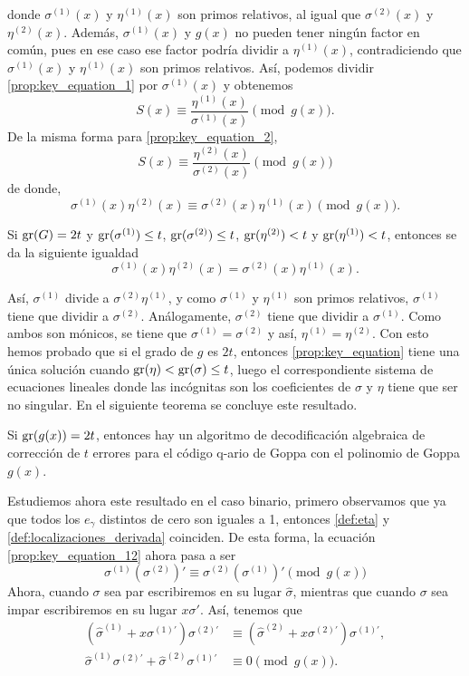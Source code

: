 donde $\sigma^{(1)}(x)$ y $\eta^{(1)}(x)$ son primos relativos, al igual que $\sigma^{(2)}(x)$ y $\eta^{(2)}(x)$. Además, $\sigma^{(1)}(x)$ y $g(x)$ no pueden tener ningún factor en común, pues en ese caso ese factor podría dividir a $\eta^{(1)}(x)$, contradiciendo que $\sigma^{(1)}(x)$ y $\eta^{(1)}(x)$ son primos relativos. Así, podemos dividir \eqref{prop:key_equation_1} por $\sigma^{(1)}(x)$ y obtenemos
\[
    S(x) \equiv \frac{\eta^{(1)}(x)}{\sigma^{(1)}(x)} \pmod{g(x)}.
\]
De la misma forma para \eqref{prop:key_equation_2},
\[
    S(x) \equiv \frac{\eta^{(2)}(x)}{\sigma^{(2)}(x)} \pmod{g(x)}
\]
de donde,
\begin{equation}
    \label{prop:key_equation_12}
    \sigma^{(1)}(x) \eta^{(2)}(x) \equiv \sigma^{(2)}(x) \eta^{(1)}(x) \pmod{g(x)}.
\end{equation}

Si $\operatorname{gr}(G) = 2t$ y $\operatorname{gr}(\sigma^{(1)}) \leq t$, $\operatorname{gr}(\sigma^{(2)}) \leq t$, $\operatorname{gr}(\eta^{(2)}) < t$ y $\operatorname{gr}(\eta^{(1)}) < t$, entonces se da la siguiente igualdad
\begin{equation}
    \label{prop:key_equation_caso1}
    \sigma^{(1)}(x) \eta^{(2)}(x) = \sigma^{(2)}(x) \eta^{(1)}(x).
\end{equation}

Así, $\sigma^{(1)}$ divide a $\sigma^{(2)} \eta^{(1)}$, y como $\sigma^{(1)}$ y $\eta^{(1)}$ son primos relativos, $\sigma^{(1)}$ tiene que dividir a $\sigma^{(2)}$. Análogamente, $\sigma^{(2)}$ tiene que dividir a $\sigma^{(1)}$. Como ambos son mónicos, se tiene que $\sigma^{(1)} = \sigma^{(2)}$ y así, $\eta^{(1)} = \eta^{(2)}$. Con esto hemos probado que si el grado de $g$ es $2t$, entonces \eqref{prop:key_equation} tiene una única solución cuando $\operatorname{gr}(\eta) < \operatorname{gr}(\sigma) \leq t$, luego el correspondiente sistema de ecuaciones lineales donde las incógnitas son los coeficientes de $\sigma$ y $\eta$ tiene que ser no singular. En el siguiente teorema se concluye este resultado.

\begin{theorem}
    Si $\operatorname{gr}(g(x)) = 2t$, entonces hay un algoritmo de decodificación algebraica de corrección de $t$ errores para el código q-ario de Goppa con el polinomio de Goppa $g(x)$.
\end{theorem}

Estudiemos ahora este resultado en el caso binario, primero observamos que ya que todos los $e_\gamma$ distintos de cero son iguales a 1, entonces \eqref{def:eta} y \eqref{def:localizaciones_derivada} coinciden. De esta forma, la ecuación \eqref{prop:key_equation_12} ahora pasa a ser
\[
    \sigma^{(1)} \left( \sigma^{(2)} \right) ' \equiv \sigma^{(2)} \left( \sigma^{(1)} \right) ' \pmod{g(x)}
\]
Ahora, cuando $\sigma$ sea par escribiremos en su lugar $\hat{\sigma}$, mientras que cuando $\sigma$ sea impar escribiremos en su lugar $x \sigma '$. Así, tenemos que
\begin{align*} 
    \left( \hat{\sigma}^{(1)} + x \sigma^{(1)'} \right) \sigma^{(2)'} &\equiv \left( \hat{\sigma}^{(2)} + x \sigma^{(2)'} \right) \sigma^{(1)'},\\ 
    \hat{\sigma}^{(1)} \sigma^{(2)'} + \hat{\sigma}^{(2)} \sigma^{(1)'} &\equiv 0 \pmod{g(x)}.
\end{align*}

